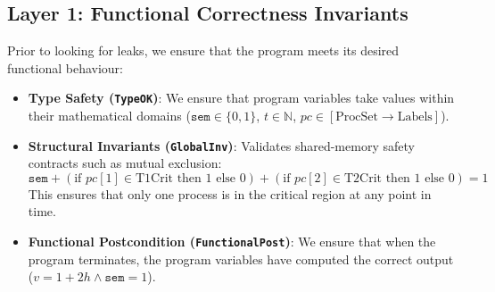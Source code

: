 \documentclass[a4paper,12pt]{report}
\begin{document}
\subsection{Layer 1: Functional Correctness Invariants}
Prior to looking for leaks, we ensure that the program meets its desired functional behaviour:
\begin{itemize}[itemsep=0.15em, topsep=0.15em]
    \item \textbf{Type Safety (\texttt{TypeOK})}: We ensure that program variables take values within their mathematical domains ($\texttt{sem} \in \{0, 1\}$, $t \in \mathbb{N}$, $pc \in [\text{ProcSet} \to \text{Labels}]$).
    \item \textbf{Structural Invariants (\texttt{GlobalInv})}: Validates shared-memory safety contracts such as mutual exclusion:
    \begin{equation}
        \texttt{sem} + (\text{if } pc[1] \in \text{T1Crit} \text{ then } 1 \text{ else } 0) + (\text{if } pc[2] \in \text{T2Crit} \text{ then } 1 \text{ else } 0) = 1
    \end{equation}
    This ensures that only one process is in the critical region at any point in time.
    \item \textbf{Functional Postcondition (\texttt{FunctionalPost})}: We ensure that when the program terminates, the program variables have computed the correct output ($v = 1 + 2h \land \texttt{sem} = 1$).
\end{itemize}
\end{document}
